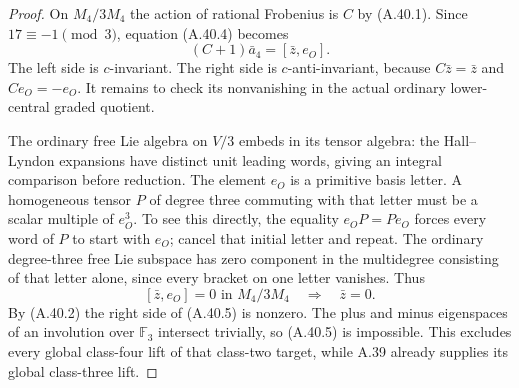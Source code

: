 \begin{proof}
On $M_4/3M_4$ the action of rational Frobenius is $C$ by
(A.40.1). Since $17\equiv-1\pmod3$, equation (A.40.4)
becomes
\[
                    (C+1)\bar a_4=[\bar z,e_O].
 \tag{A.40.5}
\]
The left side is $c$-invariant. The right side is
$c$-anti-invariant, because $C\bar z=\bar z$ and
$Ce_O=-e_O$. It remains to check its nonvanishing in the
actual ordinary lower-central graded quotient.

The ordinary free Lie algebra on $V/3$ embeds in its tensor
algebra: the Hall--Lyndon expansions have distinct unit
leading words, giving an integral comparison before reduction.
The element $e_O$ is a primitive basis letter. A homogeneous
tensor $P$ of degree three commuting with that letter must
be a scalar multiple of $e_O^3$. To see this directly, the
equality $e_OP=Pe_O$ forces every word of $P$ to start with
$e_O$; cancel that initial letter and repeat. The ordinary
degree-three free Lie subspace has zero component in the
multidegree consisting of that letter alone, since every
bracket on one letter vanishes. Thus
\[
       [\bar z,e_O]=0\text{ in }M_4/3M_4
                     \quad\Longrightarrow\quad\bar z=0.
 \tag{A.40.6}
\]
By (A.40.2) the right side of (A.40.5) is nonzero. The plus
and minus eigenspaces of an involution over $\mathbb F_3$
intersect trivially, so (A.40.5) is impossible. This excludes
every global class-four lift of that class-two target, while
A.39 already supplies its global class-three lift.
\end{proof}

